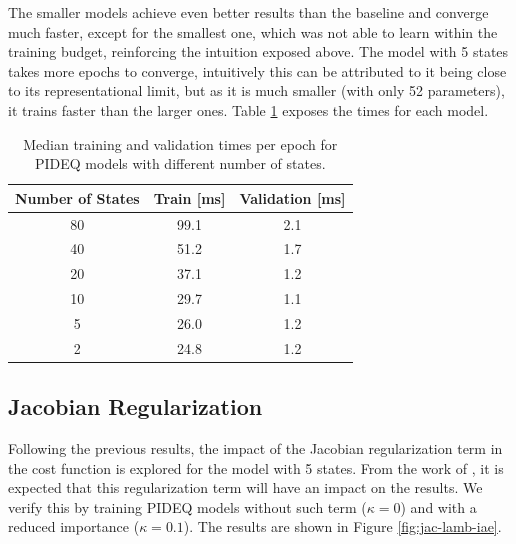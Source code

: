 The smaller models achieve even better results than the baseline and converge much faster, except for the smallest one, which was not able to learn within the training budget, reinforcing the intuition exposed above.
The model with 5 states takes more epochs to converge, intuitively this can be attributed to it being close to its representational limit, but as it is much smaller (with only 52 parameters), it trains faster than the larger ones.
Table \ref{tab:n-states-times} exposes the times for each model.

\begin{table}[h]
    \centering
    \caption{Median training and validation times per epoch for \gls{PIDEQ} models with different number of states.}
    \label{tab:n-states-times}
    \begin{tabular}{ccc}
	\toprule
	\textbf{Number of States} & \textbf{Train} [ms] & \textbf{Validation} [ms] \\ \midrule
	80       & 99.1       & 2.1             \\
	40       & 51.2       & 1.7             \\
	20       & 37.1       & 1.2             \\
	10       & 29.7       & 1.1             \\
	5        & 26.0       & 1.2             \\
	2        & 24.8       & 1.2             \\ \bottomrule
    \end{tabular}
\end{table}

\subsection{Jacobian Regularization}\label{sec:exp-jac}

Following the previous results, the impact of the Jacobian regularization term in the cost function is explored for the model with 5 states.
From the work of \textcite{bai_stabilizing_2021}, it is expected that this regularization term will have an impact on the results.
We verify this by training \gls{PIDEQ} models without such term ($\kappa=0$) and with a reduced importance ($\kappa=0.1$).
The results are shown in Figure \ref{fig:jac-lamb-iae}.

